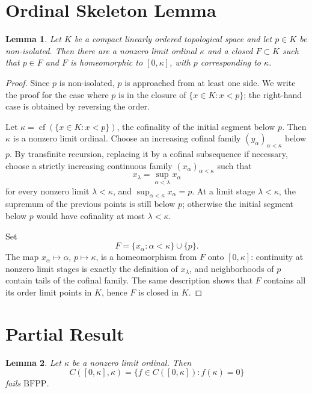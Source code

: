 \documentclass[11pt]{article}
\newtheorem{lemma}{Lemma}
\newcommand{\BFPP}{\mathrm{BFPP}}
\newcommand{\cf}{\operatorname{cf}}
\begin{document}
\section*{Ordinal Skeleton Lemma}

\begin{lemma}\label{lem:skeleton}
Let \(K\) be a compact linearly ordered topological space and let \(p\in K\)
be non-isolated.  Then there are a nonzero limit ordinal \(\kappa\) and a
closed \(F\subset K\) such that \(p\in F\) and \(F\) is homeomorphic to
\([0,\kappa]\), with \(p\) corresponding to \(\kappa\).
\end{lemma}

\begin{proof}
Since \(p\) is non-isolated, \(p\) is approached from at least one side.  We
write the proof for the case where \(p\) is in the closure of
\(\{x\in K:x<p\}\); the right-hand case is obtained by reversing the order.

Let \(\kappa=\cf(\{x\in K:x<p\})\), the cofinality of the initial segment
below \(p\).  Then \(\kappa\) is a nonzero limit ordinal.  Choose an increasing
cofinal family \((y_\alpha)_{\alpha<\kappa}\) below \(p\).  By transfinite
recursion, replacing it by a cofinal subsequence if necessary, choose a
strictly increasing continuous family \((x_\alpha)_{\alpha<\kappa}\) such that
\[
  x_\lambda=\sup_{\alpha<\lambda}x_\alpha
\]
for every nonzero limit \(\lambda<\kappa\), and
\(\sup_{\alpha<\kappa}x_\alpha=p\).  At a limit stage \(\lambda<\kappa\), the
supremum of the previous points is still below \(p\); otherwise the initial
segment below \(p\) would have cofinality at most \(\lambda<\kappa\).

Set
\[
  F=\{x_\alpha:\alpha<\kappa\}\cup\{p\}.
\]
The map \(x_\alpha\mapsto\alpha\), \(p\mapsto\kappa\), is a homeomorphism from
\(F\) onto \([0,\kappa]\): continuity at nonzero limit stages is exactly the
definition of \(x_\lambda\), and neighborhoods of \(p\) contain tails of the
cofinal family.  The same description shows that \(F\) contains all its order
limit points in \(K\), hence \(F\) is closed in \(K\).
\end{proof}

\section*{Partial Result}

\begin{lemma}\label{lem:ordinal}
Let \(\kappa\) be a nonzero limit ordinal.  Then
\[
  C([0,\kappa],\kappa)=\{f\in C([0,\kappa]):f(\kappa)=0\}
\]
fails \(\BFPP\).
\end{lemma}
\end{document}
